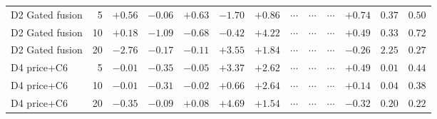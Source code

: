 \begin{table}[p]
\begin{tabular}{@{}lrrrrrrlllrrr@{}}
\addlinespace
D2 Gated fusion & 5 & $+0.56$ & $-0.06$ & $+0.63$ & $-1.70$ & $+0.86$ & $\cdot$$\cdot$$\cdot$ & $\cdot$$\cdot$$\cdot$ & $\cdot$$\cdot$$\cdot$ & $+0.74$ & $0.37$ & $0.50$ \\
D2 Gated fusion & 10 & $+0.18$ & $-1.09$ & $-0.68$ & $-0.42$ & $+4.22$ & $\cdot$$\cdot$$\cdot$ & $\cdot$$\cdot$$\cdot$ & $\cdot$$\cdot$$\cdot$ & $+0.49$ & $0.33$ & $0.72$ \\
D2 Gated fusion & 20 & $-2.76$ & $-0.17$ & $-0.11$ & $+3.55$ & $+1.84$ & $\cdot$$\cdot$$\cdot$ & $\cdot$$\cdot$$\cdot$ & $\cdot$$\cdot$$\cdot$ & $-0.26$ & $2.25$ & $0.27$ \\
\addlinespace
D4 price+C6 & 5 & $-0.01$ & $-0.35$ & $-0.05$ & $+3.37$ & $+2.62$ & $\cdot$$\cdot$$\cdot$ & $\cdot$$\cdot$$\cdot$ & $\cdot$$\cdot$$\cdot$ & $+0.49$ & $0.01$ & $0.44$ \\
D4 price+C6 & 10 & $-0.01$ & $-0.31$ & $-0.02$ & $+0.66$ & $+2.64$ & $\cdot$$\cdot$$\cdot$ & $\cdot$$\cdot$$\cdot$ & $\cdot$$\cdot$$\cdot$ & $+0.14$ & $0.04$ & $0.38$ \\
D4 price+C6 & 20 & $-0.35$ & $-0.09$ & $+0.08$ & $+4.69$ & $+1.54$ & $\cdot$$\cdot$$\cdot$ & $\cdot$$\cdot$$\cdot$ & $\cdot$$\cdot$$\cdot$ & $-0.32$ & $0.20$ & $0.22$ \\
\bottomrule
\end{tabular}
\end{table}


